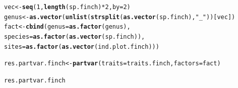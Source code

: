 \documentclass[12pt]{article}\usepackage[]{graphicx}\usepackage[]{color}
\makeatletter
\newcommand{\hlnum}[1]{\textcolor[rgb]{0.686,0.059,0.569}{#1}}%
\newcommand{\hlstr}[1]{\textcolor[rgb]{0.192,0.494,0.8}{#1}}%
\newcommand{\hlopt}[1]{\textcolor[rgb]{0,0,0}{#1}}%
\newcommand{\hlstd}[1]{\textcolor[rgb]{0.345,0.345,0.345}{#1}}%
\newcommand{\hlkwb}[1]{\textcolor[rgb]{0.69,0.353,0.396}{#1}}%
\newcommand{\hlkwc}[1]{\textcolor[rgb]{0.333,0.667,0.333}{#1}}%
\newcommand{\hlkwd}[1]{\textcolor[rgb]{0.737,0.353,0.396}{\textbf{#1}}}%
\newenvironment{kframe}{%
 \def\at@end@of@kframe{}%
 \ifinner\ifhmode%
  \def\at@end@of@kframe{\end{minipage}}%
  \begin{minipage}{\columnwidth}%
 \fi\fi%
 \def\FrameCommand##1{\hskip\@totalleftmargin \hskip-\fboxsep
 \colorbox{shadecolor}{##1}\hskip-\fboxsep
     \hskip-\linewidth \hskip-\@totalleftmargin \hskip\columnwidth}%
 \MakeFramed {\advance\hsize-\width
   \@totalleftmargin\z@ \linewidth\hsize
   \@setminipage}}%
 {\par\unskip\endMakeFramed%
 \at@end@of@kframe}
\newenvironment{knitrout}{}{} %
\makeatother
\begin{document}
\begin{knitrout}
\color{fgcolor}\begin{kframe}
\begin{alltt}
\hlstd{vec}\hlkwb{<-} \hlkwd{seq}\hlstd{(}\hlnum{1}\hlstd{,}\hlkwd{length}\hlstd{(sp.finch)}\hlopt{*}\hlnum{2}\hlstd{,} \hlkwc{by}\hlstd{=}\hlnum{2}\hlstd{)}
\hlstd{genus}\hlkwb{<-}\hlkwd{as.vector}\hlstd{(}\hlkwd{unlist}\hlstd{(}\hlkwd{strsplit}\hlstd{(}\hlkwd{as.vector}\hlstd{(sp.finch),}\hlstr{"_"}\hlstd{))[vec])}
\hlstd{fact}\hlkwb{<-}\hlkwd{cbind}\hlstd{(}\hlkwc{genus}\hlstd{=}\hlkwd{as.factor}\hlstd{(genus),}
            \hlkwc{species}\hlstd{=}\hlkwd{as.factor}\hlstd{(}\hlkwd{as.vector}\hlstd{(sp.finch)),}
            \hlkwc{sites}\hlstd{=}\hlkwd{as.factor}\hlstd{(}\hlkwd{as.vector}\hlstd{(ind.plot.finch)))}

\hlstd{res.partvar.finch}\hlkwb{<-}\hlkwd{partvar}\hlstd{(}\hlkwc{traits}\hlstd{=traits.finch,} \hlkwc{factors}\hlstd{=fact)}

\hlstd{res.partvar.finch}
\end{alltt}
\end{kframe}
\end{knitrout}
\end{document}
